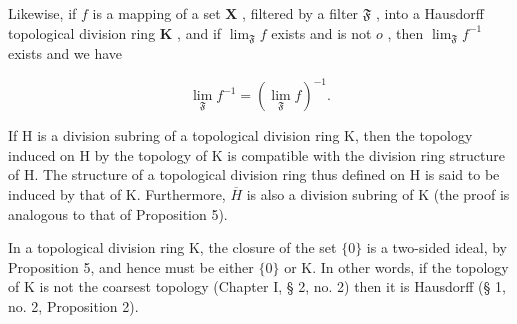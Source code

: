 Likewise, if \(f\) is a mapping of a set \(\mathbf{X}\) , filtered by a filter \(\mathfrak{F}\) , into a Hausdorff topological division ring \(\mathbf{K}\) , and if \(\lim_{\mathfrak{F}} f\) exists and is not \(o\) , then \(\lim_{\mathfrak{F}} f^{-1}\) exists and we have

\[
\lim _ {\mathfrak {F}} f ^ {- 1} = (\lim _ {\mathfrak {F}} f) ^ {- 1}.\tag{4}
\]

If H is a division subring of a topological division ring K, then the topology induced on H by the topology of K is compatible with the division ring structure of H. The structure of a topological division ring thus defined on H is said to be induced by that of K. Furthermore, \(\overline{H}\) is also a division subring of K (the proof is analogous to that of Proposition 5).

In a topological division ring K, the closure of the set \(\{0\}\) is a two-sided ideal, by Proposition 5, and hence must be either \(\{0\}\) or K. In other words, if the topology of K is not the coarsest topology (Chapter I, § 2, no. 2) then it is Hausdorff (§ 1, no. 2, Proposition 2).


